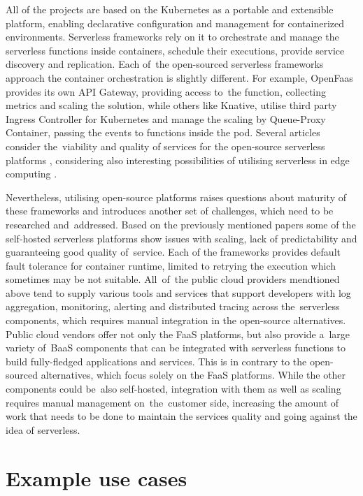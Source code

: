 All of the projects are based on the Kubernetes as a portable and extensible platform, enabling declarative configuration and management for containerized environments. Serverless frameworks rely on it to orchestrate and manage the serverless functions inside containers, schedule their executions, provide service discovery and replication. Each of~the open-sourced serverless frameworks approach the container orchestration is slightly different. For example, OpenFaas provides its own API Gateway, providing access to~the function, collecting metrics and scaling the solution, while others like Knative, utilise third party Ingress Controller for Kubernetes and manage the scaling by Queue-Proxy Container, passing the events to functions inside the pod. Several articles consider the~viability and quality of services for the open-source serverless platforms \cite{OpenSourceServelessPerformance}, considering also interesting possibilities of utilising serverless in edge computing \cite{OpenSourceServelessEdge}.

Nevertheless, utilising open-source platforms raises questions about maturity of these frameworks and introduces another set of challenges, which need to be researched and~addressed. Based on the previously mentioned papers some of the self-hosted serverless platforms show issues with scaling, lack of predictability and guaranteeing good quality of~service. Each of the frameworks provides default fault tolerance for container runtime, limited to retrying the execution which sometimes may be not suitable. All~of~the public cloud providers mendtioned above tend to supply various tools and services that support developers with log aggregation, monitoring, alerting and distributed tracing across the~serverless components, which requires manual integration in the open-source alternatives. Public cloud vendors offer not only the FaaS platforms, but also provide a~large variety of~BaaS components that can be integrated with serverless functions to build fully-fledged applications and services. This is in contrary to the open-sourced alternatives, which focus solely on the FaaS platforms. While the other components could be~also self-hosted, integration with them as well as scaling requires manual management on~the~customer side, increasing the amount of work that needs to be done to maintain the services quality and going against the idea of serverless.

\section{Example use cases} \label{chapter:serverless-example-use-cases}

